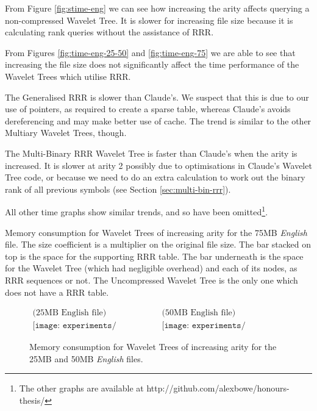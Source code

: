 From Figure \ref{fig:stime-eng} we can see how increasing the arity affects
querying a non-compressed Wavelet Tree. It is slower for increasing file size
because it is calculating rank queries without the assistance of RRR.

From Figures \ref{fig:time-eng-25-50} and \ref{fig:time-eng-75} we are able 
to see that increasing the file size does not significantly affect the time
performance of the Wavelet Trees which utilise RRR.

The Generalised RRR is slower than Claude's. We suspect that this is due to our 
use of pointers, as required to create a sparse table, whereas Claude's avoids 
dereferencing and may make better use of cache. The trend is similar to the
other Multiary Wavelet Trees, though.

The Multi-Binary RRR Wavelet Tree is faster than Claude's when the arity is 
increased. It is slower at arity 2 possibly due to optimisations in Claude's
Wavelet Tree code, or because we need to do an extra calculation to work out
the binary rank of all previous symbols (see Section 
\ref{sec:multi-bin-rrr}).

All other time graphs show similar trends, and so have been omitted\footnote{The 
other graphs are available at http://github.com/alexbowe/honours-thesis/}.

\clearpage
			{Memory consumption for Wavelet Trees of increasing arity for
			the 75MB \emph{English} file. The size coefficient is a multiplier
			on the original file size. The bar stacked on top is the space for
			the supporting RRR table. The bar underneath is the space for
			the Wavelet Tree (which had negligible overhead) and each of its
			nodes, as RRR sequences or not. The Uncompressed Wavelet Tree is
			the only one which does not have a RRR table.}
		
		\begin{figure}[h]
		\begin{center}$
		\begin{array}{cc}
		\mbox{(25MB English file)} & 
		\mbox{(50MB English file)} \\
		\texttt{[image: experiments/mem\_english\_25MB]} &
		\texttt{[image: experiments/mem\_english\_50MB]}
		\end{array}$
		\end{center}
		\caption{Memory consumption for Wavelet Trees of increasing arity 
		for the 25MB and 50MB \emph{English} files.}
		\label{fig:mem-eng-25-50}
		\end{figure}
		
